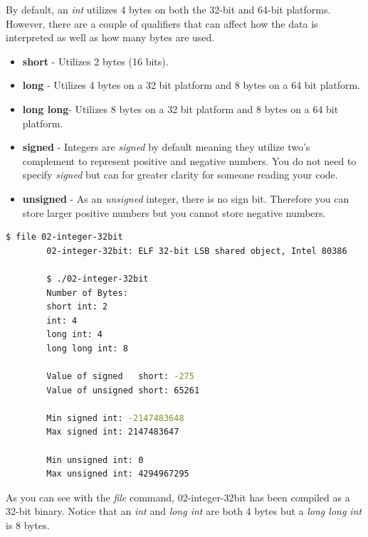 \documentclass[../main.tex]{subfiles}
\begin{document}
	By default, an \textit{int} utilizes 4 bytes on both the 32-bit and 64-bit platforms. However, there are a couple of qualifiers that can affect how the data is interpreted as well as how many bytes are used.  
	\begin{itemize}
		\item \textbf{short}	-	Utilizes 2 bytes (16 bits).
		\item \textbf{long}		-	Utilizes 4 bytes on a 32 bit platform and 8 bytes on a 64 bit platform.
		\item \textbf{long long}-	Utilizes 8 bytes on a 32 bit platform and 8 bytes on a 64 bit platform.
		\item \textbf{signed}	-	Integers are \textit{signed} by default meaning they utilize two's complement to represent positive and negative numbers.  You do not need to specify \textit{signed} but can for greater clarity for someone reading your code.
		\item \textbf{unsigned}	-	As an \textit{unsigned} integer, there is no sign bit.  Therefore you can store larger positive numbers but you cannot store negative numbers.\\
	\end{itemize}
	
	
	
	\begin{lstlisting}[language=bash, numbers=none]
		$ file 02-integer-32bit
		02-integer-32bit: ELF 32-bit LSB shared object, Intel 80386
		
		$ ./02-integer-32bit 
		Number of Bytes:
		short int: 2
		int: 4
		long int: 4
		long long int: 8
		
		Value of signed   short: -275
		Value of unsigned short: 65261
		
		Min signed int: -2147483648
		Max signed int: 2147483647
		
		Min unsigned int: 0
		Max unsigned int: 4294967295
	\end{lstlisting}
	
	As you can see with the \textit{file} command, 02-integer-32bit has been compiled as a 32-bit binary.  Notice that an \textit{int} and \textit{long int} are both 4 bytes but a \textit{long long int} is 8 bytes.  
	
\end{document}
